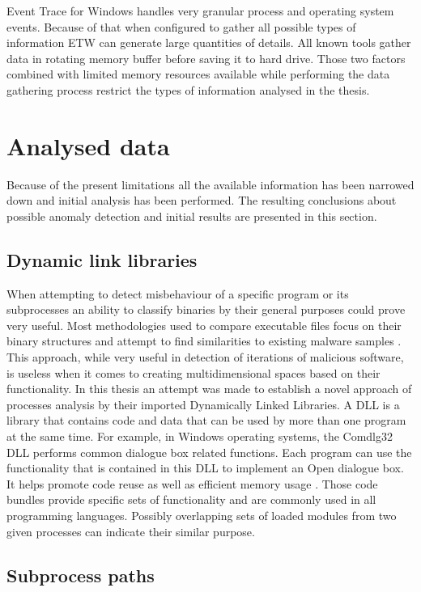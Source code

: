 \documentclass[a4paper,twoside,12pt]{book}
\begin{document}
Event Trace for Windows handles very granular process and operating system events.
Because of that when configured to gather all possible types of information ETW can generate
large quantities of details. All known tools gather data in rotating memory buffer 
before saving it to hard drive. Those two factors combined with limited memory resources 
available while performing the data gathering process restrict the types of information analysed 
in the thesis. 

\section{Analysed data}

Because of the present limitations all the available information has been narrowed down and 
initial analysis has been performed. The resulting conclusions about possible anomaly detection 
and initial results are presented in this section.

\subsection{Dynamic link libraries}

When attempting to detect misbehaviour of a specific program or its subprocesses an ability to 
classify binaries by their general purposes could prove very useful. Most methodologies used to 
compare executable files focus on their binary structures and attempt to find similarities to 
existing malware samples \cite{bib:malwclass}. This approach, while very useful in detection of 
iterations of malicious software, is useless when it comes to creating multidimensional spaces 
based on their functionality. In this thesis an attempt was made to establish a novel approach of 
processes analysis by their imported Dynamically Linked Libraries. A DLL is a library that 
contains code and data that can be used by more than one program at the same time. For example, 
in Windows operating systems, the Comdlg32 DLL performs common dialogue box related functions. Each 
program can use the functionality that is contained in this DLL to implement an Open dialogue box. 
It helps promote code reuse as well as efficient memory usage \cite{bib:dll}. Those code bundles provide 
specific sets of functionality and are commonly used in all programming languages. Possibly 
overlapping sets of loaded modules from two given processes can indicate their similar purpose. 

\subsection{Subprocess paths}
\end{document}
